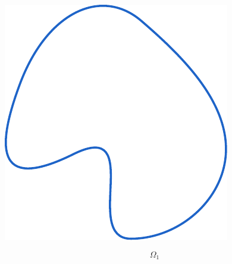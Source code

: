 \documentclass[crop, fleqn]{standalone}
\begin{document}
\begin{minipage}{60pt}
    \includegraphics[width=\linewidth]{main-theorem/omega-1.pdf}

    \vspace*{-30pt}

    \[ \Omega_{1} \]

    \vspace*{2pt}
\end{minipage}
\hspace{3pt}
\end{document}
